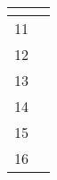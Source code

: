 \begin{center}
\begin{longtable}{|c|p{12cm}|}
\begin{journal}
	\item 
\end{journal}
\\ \hline
11 & 
\begin{journal}
	\item 
\end{journal}
\\ \hline
12 & 
\begin{journal}
	\item 
\end{journal}
\\ \hline
13 & 
\begin{journal}
	\item 
\end{journal}
\\ \hline
14 & 
\begin{journal}
	\item 
\end{journal}
\\ \hline
15 & 
\begin{journal}
	\item 
\end{journal}
\\ \hline
16 & 
\begin{journal}
	\item 
\end{journal}
\\ \hline
\end{longtable}
\end{center}

